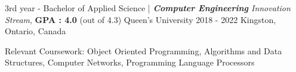 

\begin{cventries}

  \cventry
    {3rd year - Bachelor of Applied Science | \textit{\textbf{Computer Engineering} Innovation Stream}, \textbf{GPA : 4.0} (out of 4.3)} %
    {Queen's University} %
    { 2018 - 2022} %
    {Kingston, Ontario, Canada} %
    {
    \begin{cvitems} %
        \item {Relevant Coursework: Object Oriented Programming, Algorithms and Data Structures, Computer Networks, Programming Language Processors}
      \end{cvitems}
    }
\end{cventries}